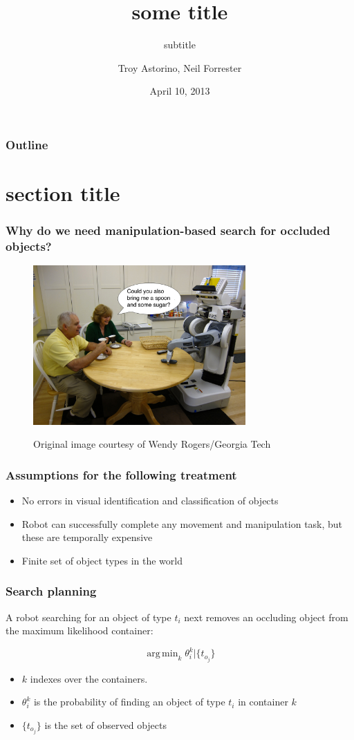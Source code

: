 \documentclass{beamer}
\title{some title}
\subtitle{subtitle}
\author{Troy Astorino, Neil Forrester}
\date{April 10, 2013}
\institute[6.834 -- MIT]{Cognitive Robotics \\ Massachusetts Institute of Technology}
\DeclareMathOperator*{\argmax}{arg\,min}
\begin{document}
\begin{frame}
  \maketitle
\end{frame}

\begin{frame}
  \frametitle{Outline}
  \tableofcontents
\end{frame}

\section{section title}
\begin{frame}
  \frametitle{Why do we need manipulation-based search for occluded
    objects?}
  \begin{figure}
    \centering
    \includegraphics[width=3.2in]{img/robot_in_kitchen.jpg}

    \tiny{Original image courtesy of Wendy Rogers/Georgia Tech}
  \end{figure}
\end{frame}

\begin{frame}
  \frametitle{Assumptions for the following treatment}
  \begin{itemize}
  \item No errors in  visual identification and classification of objects
  \item Robot can successfully complete any movement and manipulation task, but
    these are temporally expensive
  \item Finite set of object types in the world
  \end{itemize}
\end{frame}

\begin{frame}
  \frametitle{Search planning}
  A robot searching for an object of type $t_i$ next removes an occluding object
  from the maximum likelihood container:

  \[\argmax_k{\theta_i^k|\{t_{o_j}\}}\]
  
  \begin{itemize}
  \item $k$ indexes over the containers.
  \item $\theta_i^k$ is the probability of finding an object of type $t_i$ in
    container $k$
  \item $\{t_{o_j}\}$ is the set of observed objects
  \end{itemize}
\end{frame}
\end{document}
